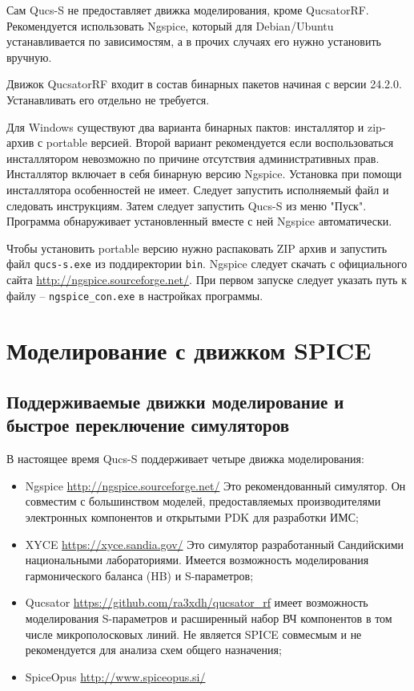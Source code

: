 \documentclass[a4paper,12pt]{article}
\begin{document}
Сам Qucs-S не предоставляет движка моделирования, кроме QucsatorRF. Рекомендуется использовать Ngspice, который для Debian/Ubuntu устанавливается по зависимостям, а в прочих случаях его нужно установить вручную. 

Движок QucsatorRF входит в состав бинарных пакетов начиная с версии 24.2.0. Устанавливать его отдельно не требуется.

Для Windows существуют два варианта бинарных пактов: инсталлятор и zip-архив с portable версией. Второй вариант рекомендуется если воспользоваться инсталлятором невозможно по причине отсутствия административных прав. Инсталлятор включает в себя бинарную версию Ngspice. Установка при помощи инсталлятора особенностей не имеет. Следует запустить исполняемый файл и следовать инструкциям. Затем следует запустить Qucs-S из меню "Пуск". Программа обнаруживает установленный вместе с ней Ngspice автоматически.

Чтобы установить portable версию нужно распаковать ZIP архив и запустить файл \verb|qucs-s.exe| из поддиректории \verb|bin|. Ngspice следует скачать с официального сайта \url{http://ngspice.sourceforge.net/}. При первом запуске следует указать путь к файлу -- \verb|ngspice_con.exe| в настройках программы. 



\section{Моделирование с движком SPICE}

\subsection{Поддерживаемые движки моделирование и быстрое переключение симуляторов}

В настоящее время Qucs-S поддерживает четыре движка моделирования:

\begin{itemize}
 \item Ngspice \url{http://ngspice.sourceforge.net/} Это рекомендованный симулятор. Он совместим с большинством моделей, предоставляемых производителями электронных компонентов и открытыми PDK для разработки ИМС;
 \item XYCE \url{https://xyce.sandia.gov/} Это симулятор разработанный Сандийскими национальными лабораториями. Имеется возможность моделирования гармонического баланса (HB) и S-параметров;
 \item Qucsator \url{https://github.com/ra3xdh/qucsator_rf} имеет возможность моделирования S-параметров и расширенный набор ВЧ компонентов в том числе микрополосковых линий. Не является SPICE совмесмым и не рекомендуется для анализа схем общего назначения;
 \item SpiceOpus \url{http://www.spiceopus.si/}
\end{itemize}
\end{document}
